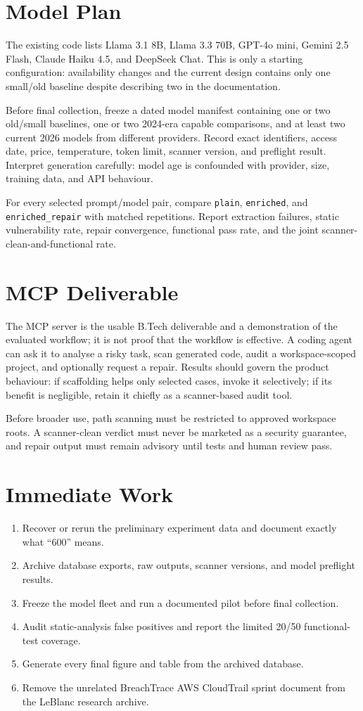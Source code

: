 \documentclass[11pt,a4paper]{article}
\begin{document}
\section{Model Plan}
The existing code lists Llama 3.1 8B, Llama 3.3 70B, GPT-4o mini, Gemini 2.5 Flash, Claude Haiku 4.5, and DeepSeek Chat. This is only a starting configuration: availability changes and the current design contains only one small/old baseline despite describing two in the documentation.

Before final collection, freeze a dated model manifest containing one or two old/small baselines, one or two 2024-era capable comparisons, and at least two current 2026 models from different providers. Record exact identifiers, access date, price, temperature, token limit, scanner version, and preflight result. Interpret generation carefully: model age is confounded with provider, size, training data, and API behaviour.

For every selected prompt/model pair, compare \texttt{plain}, \texttt{enriched}, and \texttt{enriched\_repair} with matched repetitions. Report extraction failures, static vulnerability rate, repair convergence, functional pass rate, and the joint scanner-clean-and-functional rate.

\section{MCP Deliverable}
The MCP server is the usable B.Tech deliverable and a demonstration of the evaluated workflow; it is not proof that the workflow is effective. A coding agent can ask it to analyse a risky task, scan generated code, audit a workspace-scoped project, and optionally request a repair. Results should govern the product behaviour: if scaffolding helps only selected cases, invoke it selectively; if its benefit is negligible, retain it chiefly as a scanner-based audit tool.

Before broader use, path scanning must be restricted to approved workspace roots. A scanner-clean verdict must never be marketed as a security guarantee, and repair output must remain advisory until tests and human review pass.

\section{Immediate Work}
\begin{enumerate}
\item Recover or rerun the preliminary experiment data and document exactly what ``600'' means.
\item Archive database exports, raw outputs, scanner versions, and model preflight results.
\item Freeze the model fleet and run a documented pilot before final collection.
\item Audit static-analysis false positives and report the limited 20/50 functional-test coverage.
\item Generate every final figure and table from the archived database.
\item Remove the unrelated BreachTrace AWS CloudTrail sprint document from the LeBlanc research archive.
\end{enumerate}
\end{document}
